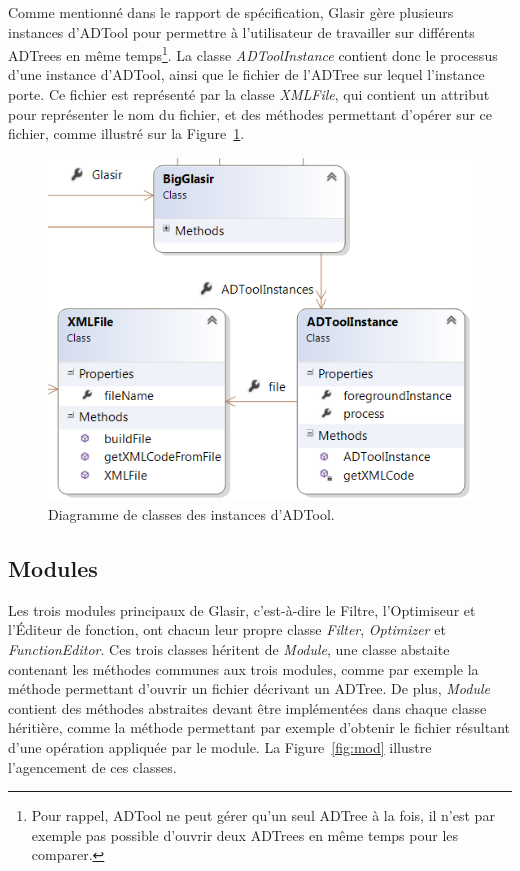     	Comme mentionné dans le rapport de spécification, Glasir gère plusieurs instances d'ADTool pour permettre à l'utilisateur de travailler sur différents ADTrees en même temps\footnote{Pour rappel, ADTool ne peut gérer qu'un seul ADTree à la fois, il n'est par exemple pas possible d'ouvrir deux ADTrees en même temps pour les comparer.}. La classe \emph{ADToolInstance} contient donc le processus d'une instance d'ADTool, ainsi que le fichier de l'ADTree sur lequel l'instance porte. Ce fichier est représenté par la classe \emph{XMLFile}, qui contient un attribut pour représenter le nom du fichier, et des méthodes permettant d'opérer sur ce fichier, comme illustré sur la {\sc Figure}~\ref{fig:instADT}.
    	
    	
    	\begin{figure}[H]
	        \centering
	        \includegraphics[height=0.5\textwidth]{figure/adtoolinstance.png}
	        \caption{Diagramme de classes des instances d'ADTool.}
	        \label{fig:instADT}
	    \end{figure}
	    


	\subsection{Modules}
    	\label{sec:diagClassMod}    	
    	
    	 Les trois modules principaux de Glasir, c'est-à-dire le Filtre, l'Optimiseur et l'Éditeur de fonction, ont chacun leur propre classe \emph{Filter}, \emph{Optimizer} et \emph{FunctionEditor}. Ces trois classes héritent de \emph{Module}, une classe abstaite contenant les méthodes communes aux trois modules, comme par exemple la méthode permettant d'ouvrir un fichier décrivant un ADTree. De plus, \emph{Module} contient des méthodes abstraites devant être implémentées dans chaque classe héritière, comme la méthode permettant par exemple d'obtenir le fichier résultant d'une opération appliquée par le module. La {\sc Figure}~\ref{fig:mod} illustre l'agencement de ces classes.
    	
